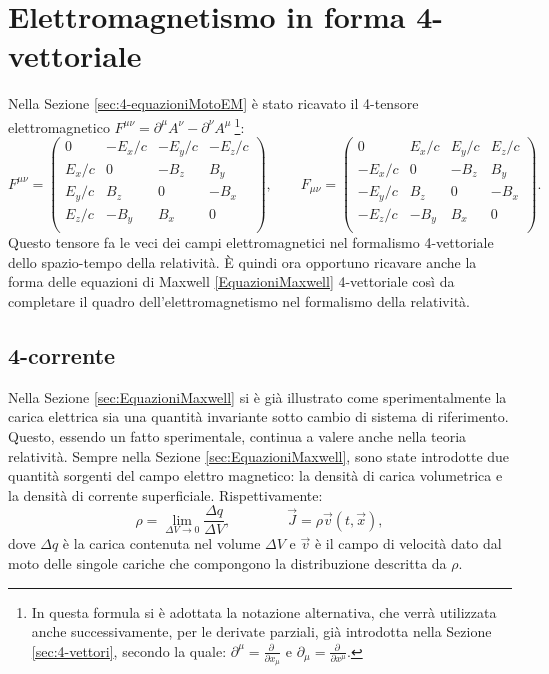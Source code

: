 \section{Elettromagnetismo in forma 4-vettoriale}
Nella Sezione \ref{sec:4-equazioniMotoEM} è stato ricavato il 4-tensore elettromagnetico $F^{\mu\nu}=\partial^\mu A^\nu-\partial^\nu A^\mu\ $\footnote{In questa formula si è adottata la notazione alternativa, che verrà utilizzata anche successivamente, per le derivate parziali, già introdotta nella Sezione \ref{sec:4-vettori}, secondo la quale: $\partial^\mu=\frac{\partial\ }{\partial x_\mu}$ e $\partial_\mu=\frac{\partial\ }{\partial x^\mu}$.}:
\begin{equation*}
        F^{\mu\nu}=
    \begin{pmatrix}
        0&-E_x/c&-E_y/c&-E_z/c\\
        E_x/c&0&-B_z&B_y\\
        E_y/c&B_z&0&-B_x\\
        E_z/c&-B_y&B_x&0\\
 \end{pmatrix},\qquad
 F_{\mu\nu}=
 \begin{pmatrix}
     0&E_x/c&E_y/c&E_z/c\\
     -E_x/c&0&-B_z&B_y\\
     -E_y/c&B_z&0&-B_x\\
     -E_z/c&-B_y&B_x&0\\
\end{pmatrix}.
\end{equation*}
Questo tensore fa le veci dei campi elettromagnetici nel formalismo 4-vettoriale dello spazio-tempo della relatività.
È quindi ora opportuno ricavare anche la forma delle equazioni di Maxwell \eqref{EquazioniMaxwell} 4-vettoriale così da completare il quadro dell'elettromagnetismo nel formalismo della relatività.
\subsection{4-corrente}\label{sec:4-corrente}
Nella Sezione \ref{sec:EquazioniMaxwell} si è già illustrato come sperimentalmente la carica elettrica sia una quantità invariante sotto cambio di sistema di riferimento. Questo, essendo un fatto sperimentale, continua a valere anche nella teoria relatività. Sempre nella Sezione \ref{sec:EquazioniMaxwell}, sono state introdotte due quantità sorgenti del campo elettro magnetico: la densità di carica volumetrica e la densità di corrente superficiale. Rispettivamente:
\begin{equation}
    \rho=\lim_{\Delta V\rightarrow 0}\frac{\Delta q}{\Delta V},\qquad\qquad \vec J=\rho\vec v(t,\vec x),\label{defRhoJ}
\end{equation}
dove $\Delta q$ è la carica contenuta nel volume $\Delta V$ e $\vec v$ è il campo di velocità dato dal moto delle singole cariche che compongono la distribuzione descritta da $\rho$.\\

